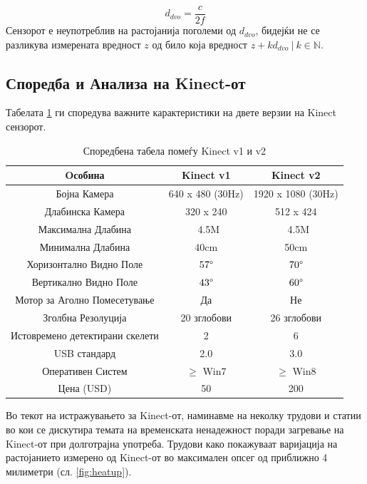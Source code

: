 \documentclass[11pt]{article}
\begin{document}
		\begin{equation}
       d_{dvo} = \frac{c}{2f}
     \end{equation}
		Сензорот е неупотреблив на растојанија поголеми од $d_{dvo}$, бидејќи не се разликува измерената вредност $z$ од било која вредност $z + k d_{dvo}\ | \ k \in \mathbb{N}$.

  \subsection{Споредба и Анализа на Kinect-от}
    Табелата \ref{tab:comparison} ги споредува важните карактеристики на двете верзии на Kinect сензорот.
    \begin{table}[H]
      \centering
      \label{tab:comparison}
      \caption{Споредбена табела помеѓу Kinect v1 и v2}
      \begin{tabular}{||c|c|c||}
        \hline
        \textbf{Oсобина} & \textbf{Kinect v1} & \textbf{Kinect v2} \\
        \hline
        Бојна Камера & 640 x 480 (30Hz) & 1920 x 1080 (30Hz) \\
        \hline
        Длабинска Камера & 320 x 240 & 512 x 424 \\
        \hline
        Максимална Длабина & ~4.5M & ~4.5M \\
        \hline
        Минимална Длабина & 40cm & 50cm \\
        \hline
        Хоризонтално Видно Поле & $57\degree$ & $70\degree$ \\
        \hline
        Вертикално Видно Поле & $43\degree$ & $60\degree$ \\
        \hline
        Мотор за Аголно Помесетување & Да & Не \\
        \hline
        Зголбна Резолуција & 20 зглобови & 26 зглобови \\
        \hline
        Истовремено детектирани скелети &  2 & 6 \\
        \hline
        USB стандард & 2.0 & 3.0 \\
        \hline
        Оперативен Систем & $\geq$ Win7 & $\geq$ Win8 \\
        \hline
        Цена (USD) & 50 & 200 \\
        \hline
      \end{tabular}
      \end{table}

    Во текот на истражувањето за Kinect-от, наминавме на неколку трудови и статии во кои се дискутира темата на временската ненадежност поради загревање на Kinect-от при долготрајна употреба. Трудови како \cite{heatup} покажуваат варијација на растојанието измерено од Kinect-от во максимален опсег од приближно 4 милиметри (сл. \ref{fig:heatup}).
\end{document}
